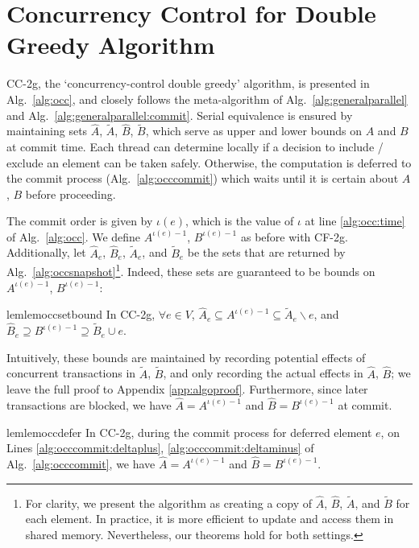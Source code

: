 \documentclass{article} %
\newcommand{\hogwild}{CF-2g}
\newcommand{\occ}{CC-2g}
\newcommand{\Comments}{1}
\newcommand{\note}[2]{\ifnum\Comments=1\textcolor{#1}{#2}\fi}
\newcommand{\xinghao}[1]{\note{red}{[XP: #1]}}
\newcommand{\algref}[1]{Alg.~\ref{#1}}
\begin{document}
\section{Concurrency Control for Double Greedy Algorithm \label{sec:algocc}}

\occ{}, the `concurrency-control double greedy' algorithm, is presented in \algref{alg:occ}, and closely follows the meta-algorithm of \algref{alg:generalparallel} and \algref{alg:generalparallel:commit}.
Serial equivalence is ensured by maintaining sets $\hat{A}$, $\tilde{A}$, $\hat{B}$, $\tilde{B}$, which serve as upper and lower bounds on $A$ and $B$ at commit time.
Each thread can determine locally if a decision to include / exclude an element can be taken safely.
Otherwise, the computation is deferred to the commit process (\algref{alg:occcommit}) which waits until it is certain about $A$, $B$ before proceeding.

The commit order is given by $\iota(e)$, which is the value of $\iota$ at line \ref{alg:occ:time} of \algref{alg:occ}.
We define $A^{\iota(e)-1}$, $B^{\iota(e)-1}$ as before with \hogwild{}.
Additionally, let $\hat{A}_e$, $\hat{B}_e$, $\tilde{A}_e$, and $\tilde{B}_e$ be the sets that are returned by \algref{alg:occsnapshot}\footnote{
  For clarity, we present the algorithm as creating a copy of $\hat{A}$, $\hat{B}$, $\tilde{A}$, and $\tilde{B}$ for each element. In practice, it is more efficient to update and access them in shared memory. Nevertheless, our theorems hold for both settings.
}.
Indeed, these sets are guaranteed to be bounds on $A^{\iota(e)-1}$, $B^{\iota(e)-1}$:

\begin{restatable}{lem}{lemoccsetbound}\label{lem:occ:set_bound}
In \occ{}, $\forall e\in V$,
$\hat{A}_e \subseteq A^{\iota(e)-1} \subseteq \tilde{A}_e \backslash e$, and $\hat{B}_e \supseteq B^{\iota(e)-1} \supseteq \tilde{B}_e \cup e$.
\end{restatable}
Intuitively, these bounds are maintained by recording potential effects of concurrent transactions in $\tilde{A}$, $\tilde{B}$, and only recording the actual effects in $\hat{A}$, $\hat{B}$;
we leave the full proof to Appendix \ref{app:algoproof}.
Furthermore, since later transactions are blocked, we have $\hat{A} = A^{\iota(e)-1}$ and $\hat{B} = B^{\iota(e)-1}$ at commit.

\begin{restatable}{lem}{lemoccdefer}\label{lem:occ:defer}
In \occ{}, during the commit process for deferred element $e$, on Lines \ref{alg:occcommit:deltaplus}, \ref{alg:occcommit:deltaminus} of \algref{alg:occcommit}, we have $\hat{A} = A^{\iota(e)-1}$ and $\hat{B} = B^{\iota(e)-1}$.
\end{restatable}
\end{document}
